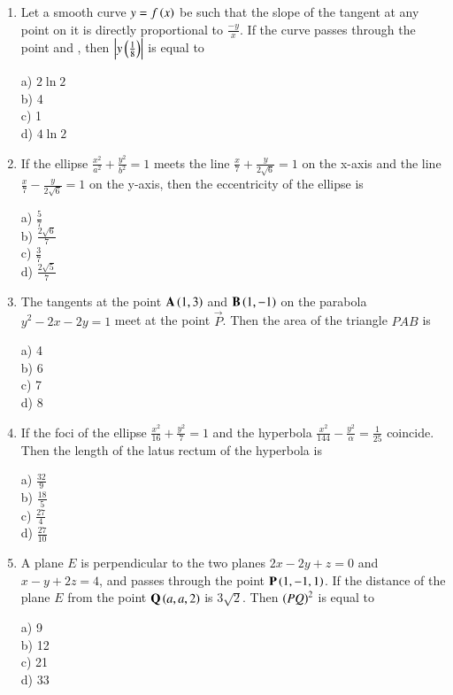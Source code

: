 \documentclass[journal]{IEEEtran}
\begin{document}
\begin{enumerate}
\begin{multicols}{4}
    a) -14\\
    b) 42\\
    c) -22\\
    d) 14
\end{multicols}
\item Let a smooth curve $y=f\left(x\right)$ be such that the slope of the tangent at any point  on it is directly proportional to $\frac{-y}{x}$. If the curve passes through the point  and , then $\left\vert y\left(\frac{1}{8}\right)\right\vert$ is equal to 
\begin{multicols}{4}
    a) $2\ln 2$\\
    b) 4\\
    c) 1\\
    d) $4\ln 2$
\end{multicols}
\item If the ellipse $\frac{x^2}{a^2}+\frac{y^2}{b^2}=1$ meets the line $\frac{x}{7}+\frac{y}{2\sqrt{6}}=1$ on the x-axis and the line $\frac{x}{7}-\frac{y}{2\sqrt{6}}=1$ on the y-axis, then the eccentricity of the ellipse is
\begin{multicols}{4}
    a) $\frac{5}{7}$\\
    b) $\frac{2\sqrt{6}}{7}$\\
    c) $\frac{3}{7}$\\
    d) $\frac{2\sqrt{5}}{7}$
\end{multicols}
\item The tangents at the point $\mathbf{A}\left(1,3\right)$ and $\mathbf{B}\left(1,-1\right)$ on the parabola $y^2-2x-2y=1$ meet at the point $\vec{P}$. Then the area of the triangle $PAB$ is
\begin{multicols}{4}
    a) 4\\
    b) 6\\
    c) 7\\
    d) 8
\end{multicols}
\item If the foci of the ellipse $\frac{x^2}{16}+\frac{y^2}{7}=1$ and the hyperbola $\frac{x^2}{144}-\frac{y^2}{\alpha}=\frac{1}{25}$ coincide. Then the length of the latus rectum of the hyperbola is
\begin{multicols}{4}
    a) $\frac{32}{9}$\\
    b) $\frac{18}{5}$\\
    c) $\frac{27}{4}$\\
    d) $\frac{27}{10}$
\end{multicols}
\item A plane $E$ is perpendicular to the two planes $2x-2y+z=0$ and $x-y+2z=4$, and passes through the point $\mathbf{P}\left(1,-1,1\right)$. If the distance of the plane $E$ from the point $\mathbf{Q}\left(a,a,2\right)$ is $3\sqrt{2}$. Then $\left(PQ\right)^2$ is equal to
\begin{multicols}{4}
    a) 9\\
    b) 12\\
    c) 21\\
    d) 33
\end{multicols}
\end{enumerate}
\end{document}
